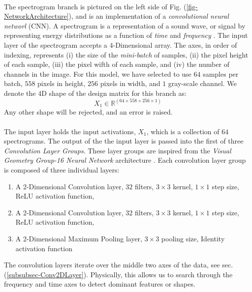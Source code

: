 \documentclass[12pt,letterpaper]{article}
\begin{document}
\paragraph*{}The spectrogram branch is pictured on the left side of Fig. (\ref{fig-NetworkArchitecture}), and is an implementation of a \textit{convolutional neural networl} (CNN). A spectrogram is a representation of a sound wave, or signal by representing energy distributions as a function of \textit{time} and \textit{frequency} \cite{White,Olson,Khan}. The input layer of the spectrogram accepts a 4-Dimensional array. The axes, in order of indexing, represents (i) the size of the \textit{mini-batch} of samples, (ii) the pixel height of each sample, (iii) the pixel wifth of each sample, and (iv) the number of channels in the image. For this model, we have selected to use $64$ samples per batch, $558$ pixels in height, $256$ pixels in width, and $1$ gray-scale channel. We denote the 4D shape of the design matrix for this branch as:
\begin{equation}
\label{eqn-shapeX1}
X_1 \in \mathbb{R}^{(64 \times 558 \times 256 \times 1)}
\end{equation}
Any other shape will be rejected, and an error is raised.

\paragraph*{}The input layer holds the input activations, $X_1$, which is a collection of $64$ spectrograms. The output of the the input layer is passed into the first of three \textit{Convolution Layer Groups}. These layer groups are inspired from the \textit{Visual Geometry Group-16 Neural Network} architecture \cite{Goodfellow,Loy}. Each convolution layer group is composed of three individual layers: 
\begin{enumerate}
\item A 2-Dimensional Convolution layer, $32$ filters, $3 \times 3$ kernel, $1 \times 1$ step size, ReLU activation function,
\item A 2-Dimensional Convolution layer, $32$ filters, $3 \times 3$ kernel, $1 \times 1$ step size, ReLU activation function,
\item A 2-Dimensional Maximum Pooling layer, $3 \times 3$ pooling size, Identity activation function
\end{enumerate}  
The convolution layers iterate over the middle two axes of the data, see sec. (\ref{subsubsec-Conv2DLayer}). Physically, this allows us to search through the frequency and time axes to detect dominant features or shapes.
\end{document}
